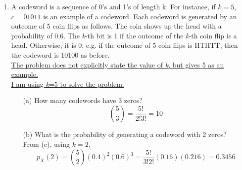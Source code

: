\documentclass{report}
\begin{document}
\begin{enumerate}
\item A codeword is a sequence of 0’s and 1’s of length k. For instance, if $k = 5$, $c = 01011$ is an example
of a codeword. Each codeword is generated by an outcome of 5 coin flips as follows. The coin shows
up the head with a probability of 0.6. The \textit{k}-th bit is 1 if the outcome of the \textit{k}-th coin flip is a head.
Otherwise, it is 0, e.g. if the outcome of 5 coin flips is HTHTT, then the codeword is 10100 as before.\\ \newline
\underline{The problem does not explicitly state the value of \textit{k}, but gives 5 as an example. }\\
\underline{I am using \textit{k}=5 to solve the problem. }
\begin{itemize}
  \item[(a)] How many codewords have 3 zeros? \\ \newline
  $$\binom{5}{3} = \frac{5!}{2!3!} = 10$$
  \item[(b)] What is the probability of generating a codeword with 2 zeros? \\ \newline
  From (c), using $k=2$,
  $$p_X(2) = \binom{5}{2}(0.4)^2(0.6)^{3} = \frac{5!}{3!2!}(0.16)(0.216) = 0.3456  $$


\end{itemize}
\end{enumerate}
\end{document}
